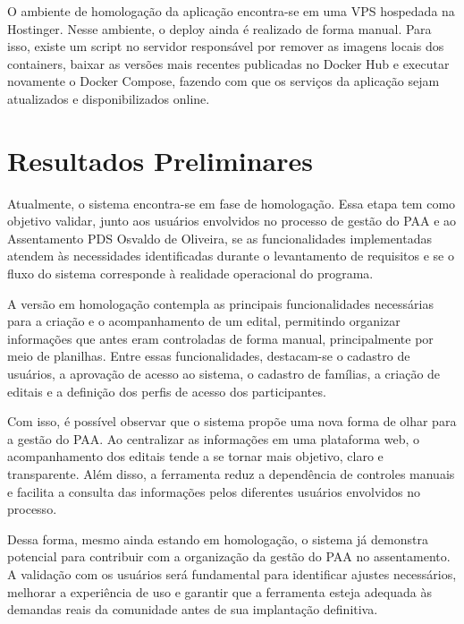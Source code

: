 O ambiente de homologação da aplicação encontra-se em uma VPS hospedada na Hostinger. Nesse ambiente, o deploy ainda é realizado de forma manual. Para isso, existe um script no servidor responsável por remover as imagens locais dos containers, baixar as versões mais recentes publicadas no Docker Hub e executar novamente o Docker Compose, fazendo com que os serviços da aplicação sejam atualizados e disponibilizados online.

\section{Resultados Preliminares}

Atualmente, o sistema encontra-se em fase de homologação. Essa etapa tem como objetivo validar, junto aos usuários envolvidos no processo de gestão do PAA e ao Assentamento PDS Osvaldo de Oliveira, se as funcionalidades implementadas atendem às necessidades identificadas durante o levantamento de requisitos e se o fluxo do sistema corresponde à realidade operacional do programa.

A versão em homologação contempla as principais funcionalidades necessárias para a criação e o acompanhamento de um edital, permitindo organizar informações que antes eram controladas de forma manual, principalmente por meio de planilhas. Entre essas funcionalidades, destacam-se o cadastro de usuários, a aprovação de acesso ao sistema, o cadastro de famílias, a criação de editais e a definição dos perfis de acesso dos participantes.

Com isso, é possível observar que o sistema propõe uma nova forma de olhar para a gestão do PAA. Ao centralizar as informações em uma plataforma web, o acompanhamento dos editais tende a se tornar mais objetivo, claro e transparente. Além disso, a ferramenta reduz a dependência de controles manuais e facilita a consulta das informações pelos diferentes usuários envolvidos no processo.

Dessa forma, mesmo ainda estando em homologação, o sistema já demonstra potencial para contribuir com a organização da gestão do PAA no assentamento. A validação com os usuários será fundamental para identificar ajustes necessários, melhorar a experiência de uso e garantir que a ferramenta esteja adequada às demandas reais da comunidade antes de sua implantação definitiva.
